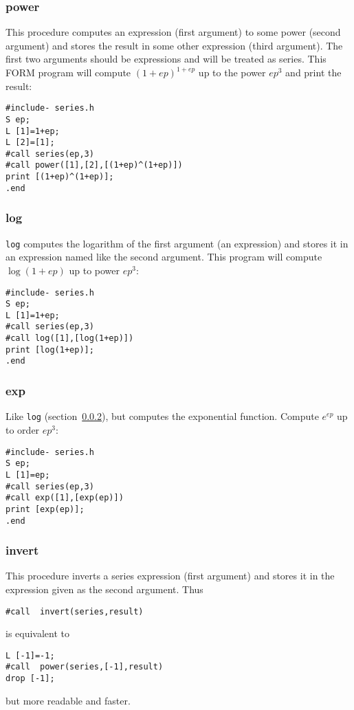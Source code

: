 \documentclass{article}
\begin{document}
\subsubsection{power}
\label{sec:pow}

This procedure computes an expression (first argument) to some power
(second argument) and stores the result in some other expression (third
argument). The first two arguments should be expressions and will be
treated as series. This FORM program will compute $(1+ep)^{1+ep}$ up to
the power $ep^3$ and print the result:
\begin{verbatim}
#include- series.h
S ep;
L [1]=1+ep;
L [2]=[1];
#call series(ep,3)
#call power([1],[2],[(1+ep)^(1+ep)])
print [(1+ep)^(1+ep)];
.end
\end{verbatim}


\subsubsection{log}
\label{sec:log}

{\tt log} computes the logarithm of the first argument (an
expression) and stores it in an expression named like the second
argument. This program will compute $\log (1+ep)$ up to power $ep^3$:
\begin{verbatim}
#include- series.h
S ep;
L [1]=1+ep;
#call series(ep,3)
#call log([1],[log(1+ep)])
print [log(1+ep)];
.end
\end{verbatim}



\subsubsection{exp}
\label{sec:exp}

Like {\tt log} (section~\ref{sec:log}), but computes the
exponential function. Compute $e^{ep}$ up to order $ep^3$:
\begin{verbatim}
#include- series.h
S ep;
L [1]=ep;
#call series(ep,3)
#call exp([1],[exp(ep)])
print [exp(ep)];
.end
\end{verbatim}


\subsubsection{invert}
\label{sec:invert}

This procedure inverts a series expression (first argument) and stores
it in the expression given as the second argument. Thus
\begin{verbatim}
#call  invert(series,result)
\end{verbatim}
is equivalent to
\begin{verbatim}
L [-1]=-1;
#call  power(series,[-1],result)
drop [-1];
\end{verbatim}
but more readable and faster.
\end{document}
